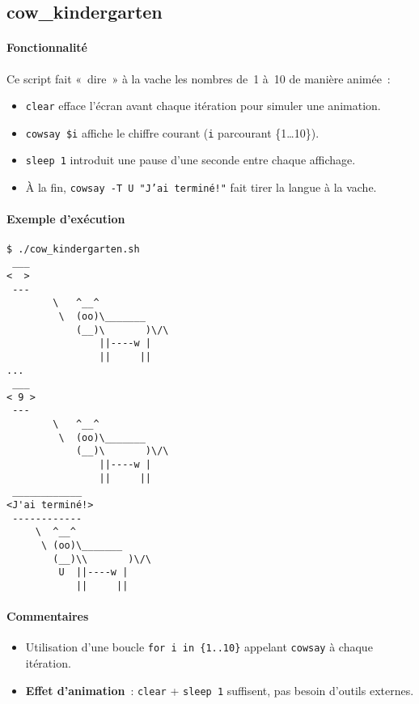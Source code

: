 \documentclass[a4paper,french,11pt]{article}
\begin{document}
\subsection{cow\_kindergarten}

\paragraph{Fonctionnalité}  
Ce script fait « dire » à la vache les nombres de 1 à 10 de manière animée :
\begin{itemize}
  \item \texttt{clear} efface l’écran avant chaque itération pour simuler une animation.
  \item \texttt{cowsay \$i} affiche le chiffre courant (\texttt{i} parcourant \{1…10\}).
  \item \texttt{sleep 1} introduit une pause d’une seconde entre chaque affichage.
  \item À la fin, \texttt{cowsay -T U "J’ai terminé!"} fait tirer la langue à la vache.
\end{itemize}

\paragraph{Exemple d’exécution}  
\begin{verbatim}
$ ./cow_kindergarten.sh
 ___
<  >
 ---
        \   ^__^
         \  (oo)\_______
            (__)\       )\/\
                ||----w |
                ||     ||
...
 ___
< 9 >
 ---
        \   ^__^
         \  (oo)\_______
            (__)\       )\/\
                ||----w |
                ||     ||
 ____________
<J'ai terminé!>
 ------------
     \  ^__^
      \ (oo)\_______  
        (__)\\       )\/\
         U  ||----w |
            ||     ||
\end{verbatim}

\paragraph{Commentaires}  
\begin{itemize}
	\item Utilisation d’une boucle \texttt{for i in \{1..10\}} appelant \texttt{cowsay} à chaque itération.
	\item \textbf{Effet d’animation} : \texttt{clear} + \texttt{sleep 1} suffisent, pas besoin d’outils externes.  
\end{itemize}
\end{document}
